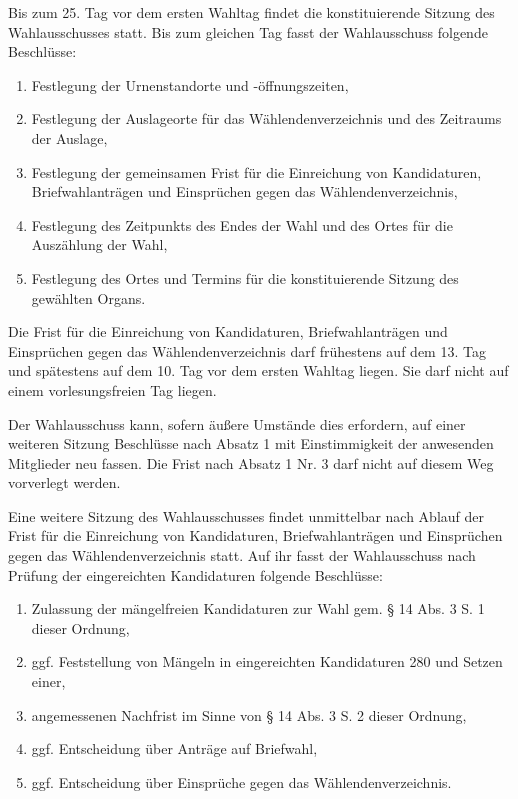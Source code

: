 \documentclass[%
draft,%
multilinesections%
]{fswo}
\begin{document}
\begin{contract}
Bis zum 25. Tag vor dem ersten Wahltag findet die konstituierende Sitzung des Wahlausschusses statt.
Bis zum gleichen Tag fasst der Wahlausschuss folgende Beschlüsse:
\begin{enumerate}
\item Festlegung der Urnenstandorte und -öffnungszeiten,
\item Festlegung der Auslageorte für das Wählendenverzeichnis und des Zeitraums der Auslage,
\item Festlegung der gemeinsamen Frist für die Einreichung von Kandidaturen, Briefwahlanträgen und Einsprüchen gegen das Wählendenverzeichnis,
\item Festlegung des Zeitpunkts des Endes der Wahl und des Ortes für die Auszählung der Wahl,
\item Festlegung des Ortes und Termins für die konstituierende Sitzung des gewählten Organs.
\end{enumerate}
Die Frist für die Einreichung von Kandidaturen, Briefwahlanträgen und Einsprüchen gegen das Wählendenverzeichnis darf frühestens auf dem 13. Tag und spätestens auf dem 10. Tag vor dem ersten Wahltag liegen.
Sie darf nicht auf einem vorlesungsfreien Tag liegen.

Der Wahlausschuss kann, sofern äußere Umstände dies erfordern, auf einer weiteren Sitzung Beschlüsse nach Absatz 1 mit Einstimmigkeit der anwesenden Mitglieder neu fassen.
Die Frist nach Absatz 1 Nr. 3 darf nicht auf diesem Weg vorverlegt werden.

Eine weitere Sitzung des Wahlausschusses findet unmittelbar nach Ablauf der Frist für die Einreichung von Kandidaturen, Briefwahlanträgen und Einsprüchen gegen das Wählendenverzeichnis statt.
Auf ihr fasst der Wahlausschuss nach Prüfung der eingereichten Kandidaturen folgende Beschlüsse:
\begin{enumerate}
\item Zulassung der mängelfreien Kandidaturen zur Wahl gem. § 14 Abs. 3 S. 1 dieser Ordnung,
\item ggf. Feststellung von Mängeln in eingereichten Kandidaturen 280 und Setzen einer,
\item angemessenen Nachfrist im Sinne von § 14 Abs. 3 S. 2 dieser Ordnung,
\item ggf. Entscheidung über Anträge auf Briefwahl,
\item ggf. Entscheidung über Einsprüche gegen das Wählendenverzeichnis.
\end{enumerate}


\end{contract}
\end{document}
